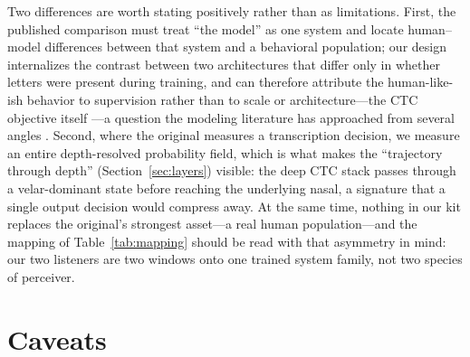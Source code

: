 \documentclass[11pt,a4paper]{article}
\begin{document}
Two differences are worth stating positively rather than as
limitations. First, the published comparison must treat ``the model''
as one system and locate human--model differences between that system
and a behavioral population; our design internalizes the contrast
between two architectures that differ only in whether letters were
present during training, and can therefore attribute the
human-like-ish behavior to supervision rather than to scale or
architecture---the CTC objective itself \citep{graves2006}---a
question the modeling literature has approached from several angles
\citep{jiang2020, pouw2024}. Second, where the original measures a transcription
decision, we measure an entire depth-resolved probability field, which
is what makes the ``trajectory through depth''
(Section~\ref{sec:layers}) visible: the deep CTC stack passes through
a velar-dominant state before reaching the underlying nasal, a
signature that a single output decision would compress away. At the
same time, nothing in our kit replaces the original's strongest
asset---a real human population---and the mapping of
Table~\ref{tab:mapping} should be read with that asymmetry in mind:
our two listeners are two windows onto one trained system family, not
two species of perceiver.

\section{Caveats}
\label{sec:caveats}
\end{document}
